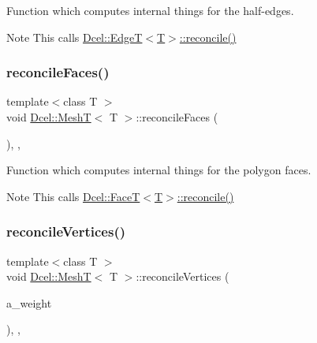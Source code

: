 Function which computes internal things for the half-\/edges. 

\begin{DoxyNote}{Note}
This calls \hyperlink{classDcel_1_1EdgeT_ac4aaf294fd41c84ef2f7f54a8024e6dd}{Dcel\+::\+Edge\+T$<$\+T$>$\+::reconcile()} 
\end{DoxyNote}
\mbox{\label{classDcel_1_1MeshT_a5e31ae8b95c9ee725e205d8ae4fd35dc}} 
\subsubsection{\texorpdfstring{reconcile\+Faces()}{reconcileFaces()}}
{\footnotesize\ttfamily template$<$class T $>$ \\
void \hyperlink{classDcel_1_1MeshT}{Dcel\+::\+MeshT}$<$ T $>$\+::reconcile\+Faces (\begin{DoxyParamCaption}{ }\end{DoxyParamCaption})\hspace{0.3cm}{\ttfamily [inline]}, {\ttfamily [protected]}, {\ttfamily [noexcept]}}



Function which computes internal things for the polygon faces. 

\begin{DoxyNote}{Note}
This calls \hyperlink{classDcel_1_1FaceT_aaf3f8b92ca4393391ea213b0ecfe19bd}{Dcel\+::\+Face\+T$<$\+T$>$\+::reconcile()} 
\end{DoxyNote}
\mbox{\label{classDcel_1_1MeshT_ad2b65aa214d51ecd438bc876e7255290}} 
\subsubsection{\texorpdfstring{reconcile\+Vertices()}{reconcileVertices()}}
{\footnotesize\ttfamily template$<$class T $>$ \\
void \hyperlink{classDcel_1_1MeshT}{Dcel\+::\+MeshT}$<$ T $>$\+::reconcile\+Vertices (\begin{DoxyParamCaption}\item[{typename \hyperlink{classDcel_1_1MeshT}{Dcel\+::\+MeshT}$<$ T $>$\+::\hyperlink{classDcel_1_1MeshT_a0cd3a02853cf4fcc34a0816368ed4dc0}{Vertex\+Normal\+Weight}}]{a\+\_\+weight }\end{DoxyParamCaption})\hspace{0.3cm}{\ttfamily [inline]}, {\ttfamily [protected]}, {\ttfamily [noexcept]}}



